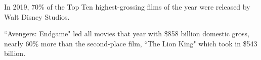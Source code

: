 \documentclass{article}
\begin{document}
In 2019, 70\% of the Top Ten highest-grossing films of the year were released by Walt Disney Studios.

``Avengers: Endgame" led all movies that year with \$858 billion domestic gross, nearly 60\% more than the second-place film, ``The Lion King" which took in \$543 billion.
\end{document}
